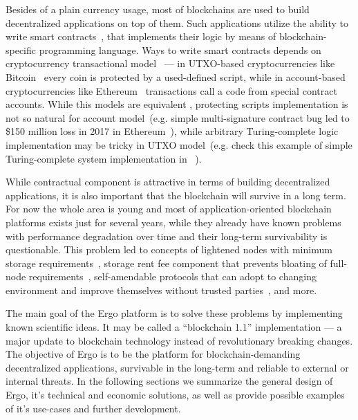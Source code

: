 Besides of a plain currency usage, most of blockchains are used to build decentralized applications on top of them.
Such applications utilize the ability to write smart contracts~\cite{szabo1994smart}, that implements their logic
by means of blockchain-specific programming language.
Ways to write smart contracts depends on cryptocurrency transactional model~\cite{zahnentferner2018chimeric} ---
in UTXO-based cryptocurrencies like Bitcoin~\cite{nakamoto2008bitcoin} every coin is protected by a used-defined script,
while in account-based cryptocurrencies like Ethereum~\cite{ethWhitepaper} transactions call a code from special contract accounts.
While this models are equivalent , protecting scripts implementation is not so natural for
account model~(e.g. simple multi-signature contract bug led to \$150 million loss in 2017 in Ethereum~\cite{parityLock}),
while arbitrary Turing-complete logic implementation may be tricky in UTXO model~(e.g. check this example of
simple Turing-complete system implementation in \Ergo{}~\cite{chepurnoy2018self}).

While contractual component is attractive in terms of building decentralized applications,
it is also important that the blockchain will survive in a long term.
For now the whole area is young and most of application-oriented blockchain platforms exists just for several years,
while they already have known problems with performance degradation over time 
and their long-term survivability is questionable.
This problem led to concepts of lightened nodes with minimum storage requirements~\cite{reyzin2017improving},
storage rent fee component that prevents bloating of full-node requirements~\cite{chepurnoy2018systematic},
self-amendable protocols that can adopt to changing environment and improve themselves without
trusted parties~\cite{goodman2014tezos}, and more.

The main goal of the Ergo platform is to solve these problems by implementing known scientific ideas.
It may be called a ``blockchain 1.1'' implementation --- a major update to
blockchain technology instead of revolutionary breaking changes.
The objective of Ergo is to be the platform for blockchain-demanding decentralized
applications, survivable in the long-term and reliable to external or internal threats.
In the following sections we summarize the general design of Ergo, it's technical and economic solutions,
as well as provide possible examples of it's use-cases and further development.